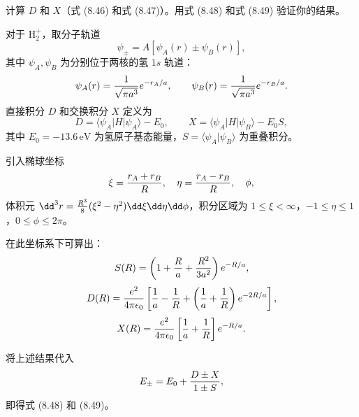 \begin{question}
计算 $D$ 和 $X$（式 (8.46) 和式 (8.47)）。用式 (8.48) 和式 (8.49) 验证你的结果。

\par\smallskip
{}

\end{question}
\begin{solution}
对于 $\mathrm H_2^+$，取分子轨道
\[
\psi_\pm=A[\psi_A(r)\pm\psi_B(r)],
\]
其中 $\psi_A,\psi_B$ 为分别位于两核的氢 $1s$ 轨道：
\[
\psi_A(r)={1\over\sqrt{\pi a^3}}e^{-r_A/a},\qquad
\psi_B(r)={1\over\sqrt{\pi a^3}}e^{-r_B/a}.
\]
直接积分 $D$ 和交换积分 $X$ 定义为
\[
D=\langle\psi_A|H|\psi_A\rangle-E_0,\qquad
X=\langle\psi_A|H|\psi_B\rangle-E_0S,
\]
其中 $E_0=-13.6\,\mathrm{eV}$ 为氢原子基态能量，$S=\langle\psi_A|\psi_B\rangle$ 为重叠积分。

引入椭球坐标
\[
\xi={r_A+r_B\over R},\quad \eta={r_A-r_B\over R},\quad \phi,
\]
体积元 $\dd^3r={R^3\over8}(\xi^2-\eta^2)\dd\xi\dd\eta\dd\phi$，积分区域为 $1\le\xi<\infty$，$-1\le\eta\le1$，$0\le\phi\le2\pi$。

在此坐标系下可算出：
\[
S(R)=\left(1+{R\over a}+{R^2\over3a^2}\right)e^{-R/a},
\]
\[
D(R)={e^2\over4\pi\epsilon_0}\left[{1\over a}-{1\over R}+\left({1\over a}+{1\over R}\right)e^{-2R/a}\right],
\]
\[
X(R)={e^2\over4\pi\epsilon_0}\left[{1\over a}+{1\over R}\right]e^{-R/a}.
\]

将上述结果代入
\[
E_\pm=E_0+{D\pm X\over1\pm S},
\]
即得式 (8.48) 和 (8.49)。
\end{solution}

